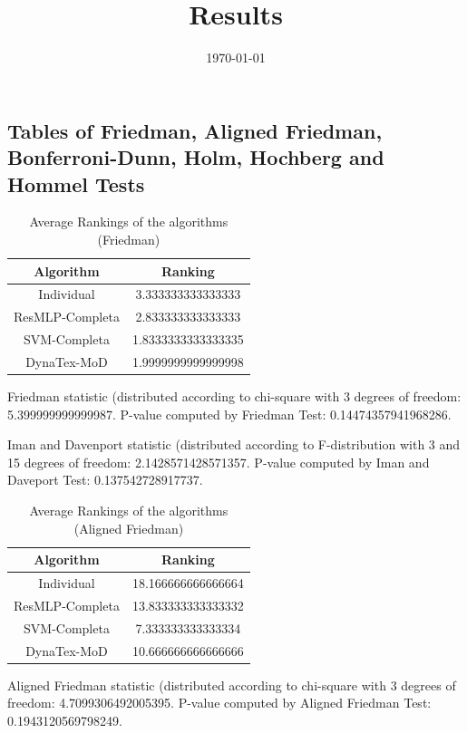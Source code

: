 \documentclass[a4paper,10pt]{article}
\title{Results}
\author{}
\date{\today}
\begin{document}
\begin{landscape}
\oddsidemargin 0in \topmargin 0in\maketitle
\section{Tables of Friedman, Aligned Friedman, Bonferroni-Dunn, Holm, Hochberg and Hommel Tests}
\begin{table}[!htp]
\centering
\caption{Average Rankings of the algorithms (Friedman)
}\begin{tabular}{c|c}
Algorithm&Ranking\\
\hline
Individual&3.333333333333333\\
ResMLP-Completa&2.833333333333333\\
SVM-Completa&1.8333333333333335\\
DynaTex-MoD&1.9999999999999998\\
\end{tabular}
\end{table}


Friedman statistic (distributed according to chi-square with 3 degrees of freedom: 5.399999999999987. 
P-value computed by Friedman Test: 0.14474357941968286.\newline

Iman and Davenport statistic (distributed according to F-distribution with 3 and 15 degrees of freedom: 2.1428571428571357. 
P-value computed by Iman and Daveport Test: 0.137542728917737.\newline


\newpage

\begin{table}[!htp]
\centering
\caption{Average Rankings of the algorithms (Aligned Friedman)
}\begin{tabular}{c|c}
Algorithm&Ranking\\
\hline
Individual&18.166666666666664\\
ResMLP-Completa&13.833333333333332\\
SVM-Completa&7.333333333333334\\
DynaTex-MoD&10.666666666666666\\
\end{tabular}
\end{table}


Aligned Friedman statistic (distributed according to chi-square with 3 degrees of freedom: 4.7099306492005395. 
P-value computed by Aligned Friedman Test: 0.1943120569798249.\newline



\end{landscape}
\end{document}
